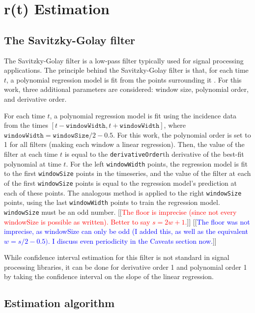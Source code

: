 \documentclass{article}
\newcommand{\code}[1]{\texttt{#1}}
\newcommand{\jd}[1]{[[\textcolor{red}{#1}]]}  \newcommand{\msComment}[1]{[[\textcolor{blue}{#1}]]}
\newcommand{\jd}[1]{} \newcommand{\msComment}[1]{}
\begin{document}
\section{r(t) Estimation}

\subsection{The Savitzky-Golay filter}
	The Savitzky-Golay filter is a low-pass filter typically used for signal processing applications. The principle behind the Savitzky-Golay filter is that, for each time $t$, a polynomial regression model is fit from the points surrounding it \cite{SG}. For this work, three additional parameters are considered: window size, polynomial order, and derivative order. 
	
	For each time $t$, a polynomial regression model is fit using the incidence data from the times $[t-\code{windowWidth}, t+\code{windowWidth}]$, where $\code{windowWidth} = \code{windowSize}/2 - 0.5$. For this work, the polynomial order is set to 1 for all filters (making each window a linear regression). Then, the value of the filter at each time $t$ is equal to the \code{derivativeOrder}th derivative of the best-fit polynomial at time $t$. For the left \code{windowWidth} points, the regression model is fit to the first \code{windowSize} points in the timeseries, and the value of the filter at each of the first \code{windowSize} points is equal to the regression model's prediction at each of these points. The analogous method is applied to the right \code{windowSize} points, using the last \code{windowWidth} points to train the regression model. \code{windowSize} must be an odd number.
	\jd{The floor is imprecise (since not every windowSize is possible as written). Better to say $s=2w+1$.} \msComment{The floor was not imprecise, as windowSize can only be odd (I added this, as well as the equivalent $w=s/2 - 0.5)$. I discuss even periodicity in the Caveats section now.}

	While confidence interval estimation for this filter is not standard in signal processing libraries, it can be done for derivative order 1 and polynomial order 1 by taking the confidence interval on the slope of the linear regression.

\subsection{Estimation algorithm}
\end{document}
